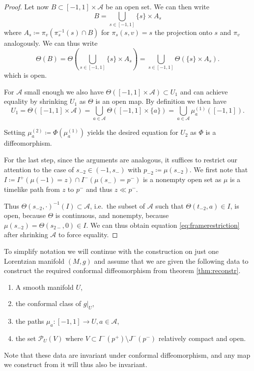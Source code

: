 \begin{proof}
Let now $B\subset[-1,1]\times\mathcal{A}$ be an open set. We can then write 
\[
B = \bigcup_{s\in [-1,1]}\{s\}\times A_s
\]
where $A_s\coloneqq\pi_v(\pi_s^{-1}(s)\cap B)$ for $\pi_s(s,v)=s$ the projection onto $s$ and $\pi_v$ analogously.
We can thus write 
\[
\Theta(B) = \Theta\left(\bigcup_{s\in [-1,1]}\{s\}\times A_s\right) = \bigcup_{s\in[-1,1]}\Theta(\{s\}\times A_s).
\]
which is open.

For $\mathcal{A}$ small enough we also have $\Theta([-1,1]\times\mathcal{A}) \subset U_1$ and can achieve equality by shrinking $U_1$ as $\Theta$ is an open map. By definition we then have 
\[
U_1 = \Theta([-1,1]\times\mathcal{A}) =  \bigcup_{a\in \mathcal{A}} \Theta([-1,1]\times\{a\}) = \bigcup_{a\in \mathcal{A}} \mu^{(1)}_a([-1,1]).
\]

Setting $\mu^{(2)}_a \coloneqq \Phi(\mu^{(1)}_a)$ yields the desired equation for $U_2$ as $\Phi$ is a diffeomorphism.

For the last step, since the arguments are analogous, it suffices to restrict our attention to the case of $s_{-2}\in (-1,s_-)$ with $p_{-2}\coloneqq\mu(s_{-2})$. We first note that $I\coloneqq I^+(\mu(-1)=z)\cap I^-(\mu(s_-)=p^-)$ is a nonempty open set as $\mu$ is a timelike path from $z$ to $p^-$ and thus $z\ll  p^-$.

Thus $\Theta(s_{-2},\cdot)^{-1}(I)\subset \mathcal{A}$, i.e.\ the subset of $\mathcal{A}$ such that $\Theta(t_{-2},a)\in I$, is open, because $\Theta$ is continuous, and nonempty, because $\mu(s_{-2}) = \Theta(s_{2-},0)\in I$.
We can thus obtain equation \eqref{eq:framerestriction} after shrinking $\mathcal{A}$ to force equality.
\end{proof}

\begin{remark}\label{rmk:data}To simplify notation we will continue with the construction on just one Lorentzian manifold $(M,g)$ and assume that we are given the following data to construct the required conformal diffeomorphism from theorem \ref{thm:reconstr}.
\begin{enumerate}
    \item A smooth manifold $U$,
    \item the conformal class of $g\rvert_U$,
    \item the paths $\mu_a:[-1,1]\to U, a\in \mathcal{A}$,
    \item the set $\mathcal{P}_U(V)$ where $V\subset I^-(p^+)\setminus J^-(p^-)$ relatively compact and open.
\end{enumerate}
Note that these data are invariant under conformal diffeomorphism, and any map we construct from it will thus also be invariant. 
\end{remark}


